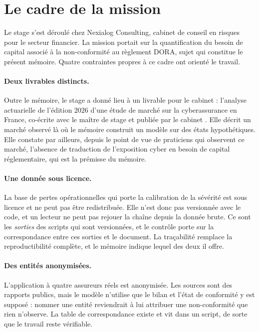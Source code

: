 
\section{Le cadre de la mission}
\label{ens:cadre}

Le stage s'est déroulé chez Nexialog Consulting, cabinet de conseil en risques pour
le secteur financier. La mission portait sur la quantification du besoin de capital
associé à la non-conformité au règlement DORA, sujet qui constitue le
présent mémoire. Quatre contraintes propres à ce cadre ont orienté le travail.

\paragraph{Deux livrables distincts.} Outre le mémoire, le stage a donné lieu à un
livrable pour le cabinet : l'analyse actuarielle de l'édition $2026$ d'une étude
de marché sur la cyberassurance en France, co-écrite avec le maître de stage et
publiée par le cabinet \citep{RapiorKaddouri2026}. Elle décrit un marché observé là
où le mémoire construit un modèle sur des états hypothétiques. Elle constate par
ailleurs, depuis le point de vue de praticiens qui observent ce marché, l'absence de
traduction de l'exposition cyber en besoin de capital réglementaire, qui est la
prémisse du mémoire.

\paragraph{Une donnée sous licence.} La base de pertes opérationnelles qui porte la
calibration de la sévérité est sous licence et ne peut pas être redistribuée. Elle
n'est donc pas versionnée avec le code, et un lecteur ne peut pas rejouer la chaîne
depuis la donnée brute. Ce sont les \emph{sorties} des scripts qui sont versionnées,
et le contrôle porte sur la correspondance entre ces sorties et le document. La
traçabilité remplace la reproductibilité complète, et le mémoire indique lequel des
deux il offre.

\paragraph{Des entités anonymisées.} L'application à quatre assureurs réels est
anonymisée. Les sources sont des rapports publics, mais le modèle n'utilise que le
bilan et l'état de conformité y est supposé : nommer une entité reviendrait à lui
attribuer une non-conformité que rien n'observe. La table de correspondance existe
et vit dans un script, de sorte que le travail reste vérifiable.

